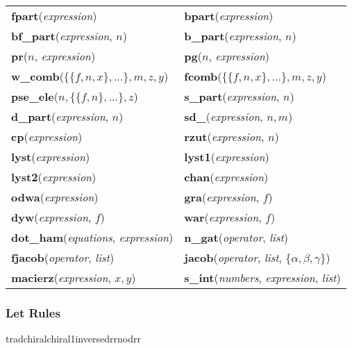 {\begin{center}
  \begin{tabular}{ll}
    \textbf{fpart}(\textit{expression}) &
    \textbf{bpart}(\textit{expression}) \\
    \textbf{bf\_part}(\textit{expression}, $n$) &
    \textbf{b\_part}(\textit{expression}, $n$) \\
    \textbf{pr}($n$, \textit{expression}) &
    \textbf{pg}($n$, \textit{expression}) \\
    \textbf{w\_comb}($\{\{f,n,x\},\ldots\},m,z,y$) &
    \textbf{fcomb}($\{\{f,n,x\},\ldots\},m,z,y$) \\
    \textbf{pse\_ele}($n,\{\{f,n\},\ldots\},z$) &
    \textbf{s\_part}(\textit{expression}, $n$) \\
    \textbf{d\_part}(\textit{expression}, $n$) &
    \textbf{sd\_}(\textit{expression}, $n,m$) \\
    \textbf{cp}(\textit{expression}) &
    \textbf{rzut}(\textit{expression}, $n$) \\
    \textbf{lyst}(\textit{expression}) &
    \textbf{lyst1}(\textit{expression}) \\
    \textbf{lyst2}(\textit{expression}) &
    \textbf{chan}(\textit{expression}) \\
    \textbf{odwa}(\textit{expression}) &
    \textbf{gra}(\textit{expression}, $f$) \\
    \textbf{dyw}(\textit{expression}, $f$) &
    \textbf{war}(\textit{expression}, $f$) \\
    \textbf{dot\_ham}(\textit{equations}, \textit{expression})&
    \textbf{n\_gat}(\textit{operator}, \textit{list}) \\
    \textbf{fjacob}(\textit{operator}, \textit{list}) &
    \textbf{jacob}(\textit{operator}, \textit{list}, \{$\alpha,\beta,\gamma$\}) \\
    \textbf{macierz}(\textit{expression}, $x,y$) &
    \textbf{s\_int}(\textit{numbers}, \textit{expression}, \textit{list})
  \end{tabular}
\end{center}

\subsubsection*{Let Rules}

\begin{center}\ttfamily
  trad\qquad chiral\qquad chiral1\qquad inverse\qquad drr\qquad nodrr
\end{center}

} %

